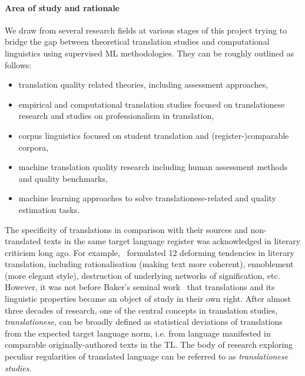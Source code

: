 \paragraph{Area of study and rationale} 

We draw from several research fields at various stages of this project trying to bridge the gap between theoretical translation studies and computational linguistics using supervised \gls{ML} methodologies. They can be roughly outlined as follows:
\begin{itemize}\compresslist{}
	\item translation quality related theories, including assessment approaches,
	\item empirical and computational translation studies focused on translationese research and studies on professionalism in translation,
	\item corpus linguistics focused on student translation and (register-)comparable corpora,
	\item machine translation quality research including human assessment methods and quality benchmarks,
	\item machine learning approaches to solve translationese-related and quality estimation tasks.
\end{itemize}

The specificity of translations in comparison with their sources and non-translated texts in the same target language register was acknowledged in literary criticism long ago. For example,~\citet{Berman1985} formulated 12 deforming tendencies in literary translation, including rationalisation (making text more coherent), ennoblement (more elegant style), destruction of underlying networks of signification, etc. However, it was not before Baker's seminal work~\cite{Baker1993} that translations and its linguistic properties became an object of study in their own right. After almost three decades of research, one of the central concepts in translation studies, \textit{translationese}, can be broadly defined as statistical deviations of translations from the expected target language norm, i.e. from language manifested in comparable originally-authored texts in the \gls{TL}. The body of research exploring peculiar regularities of translated language can be referred to as \textit{translationese studies}. 

